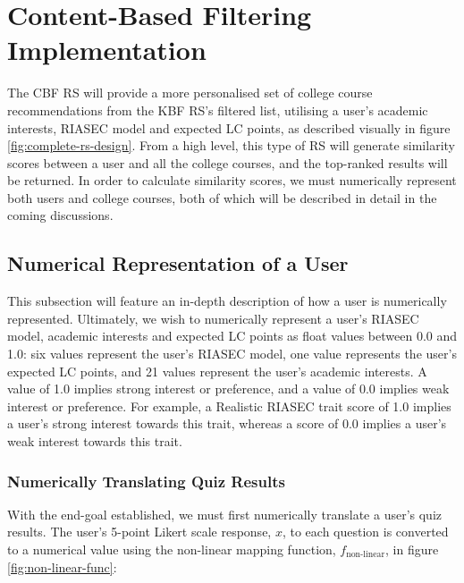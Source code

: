 \section{Content-Based Filtering Implementation}
\label{sec:cbf-impl}

The CBF RS will provide a more personalised set of college course recommendations from the KBF RS's filtered list,
utilising a user's academic interests, RIASEC model and expected LC points, as described visually in figure \ref{fig:complete-rs-design}.
From a high level, this type of RS will generate similarity scores between a user and all the college courses,
and the top-ranked results will be returned.
In order to calculate similarity scores, we must numerically represent both users and college courses,
both of which will be described in detail in the coming discussions.

\subsection{Numerical Representation of a User}
\label{sec:nump-rep-user}

This subsection will feature an in-depth description of how a user is numerically represented.
Ultimately, we wish to numerically represent a user's RIASEC model, academic interests and expected LC points as float values between 0.0 and 1.0:
six values represent the user's RIASEC model, one value represents the user's expected LC points, and 21 values represent the user's academic interests.
A value of 1.0 implies strong interest or preference, and a value of 0.0 implies weak interest or preference.
For example, a Realistic RIASEC trait score of 1.0 implies a user's strong interest towards this trait,
whereas a score of 0.0 implies a user's weak interest towards this trait.

\subsubsection{Numerically Translating Quiz Results}

With the end-goal established, we must first numerically translate a user's quiz results.
The user's 5-point Likert scale response, $x$, to each question is converted to a numerical value 
using the non-linear mapping function, $f_{\text{non-linear}}$, in figure \ref{fig:non-linear-func}:

